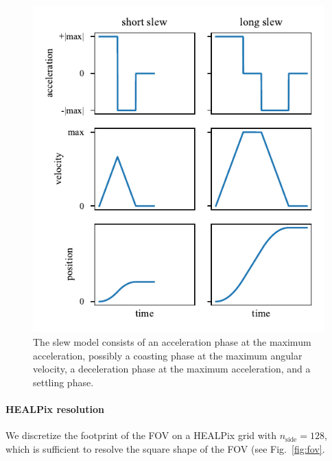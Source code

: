 \documentclass[twocolumn,times]{aastex631}
\begin{document}
\begin{figure}
    \includegraphics[width=\columnwidth]{figures/slew}
    \caption{\label{fig:slew}The slew model consists of an acceleration phase at the maximum acceleration, possibly a coasting phase at the maximum angular velocity, a deceleration phase at the maximum acceleration, and a settling phase.}
\end{figure}

\paragraph{\ac{HEALPix} resolution}
We discretize the footprint of the \ac{FOV} on a \ac{HEALPix} grid with $n_\mathrm{side} = 128$, which is sufficient to resolve the square shape of the \ac{FOV} (see Fig.~\ref{fig:fov}.
\end{document}
